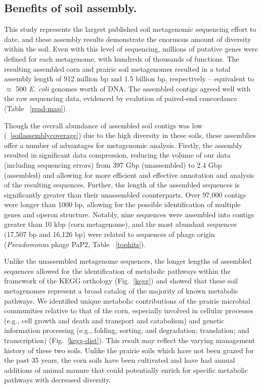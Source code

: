 \documentclass{pnastwo}
\begin{document}
\begin{article}
\subsection*{Benefits of soil assembly.} 
This study represents the largest
published soil metagenomic sequencing effort to date, and these assembly results
demonstrate the enormous amount of diversity within the soil. Even with this
level of sequencing, millions of putative genes were defined for each
metagenome, with hundreds of thousands of functions. The resulting assembled
corn and prairie soil metagenomes resulted in a total assembly length of 912
million bp and 1.5 billion bp, respectively -- equivalent to $\approx$ 500
\emph{E. coli} genomes worth of DNA. The assembled contigs agreed well with the
raw sequencing data, evidenced by evalution of paired-end concordance (Table
~\ref{read-map}).

Though the overall abundance of assembled soil contigs was low (~\ref{soilassemblycoverage}) due to 
the high diversity in these soils, these assemblies offer a number of advantages for metagenomic
analysis. Firstly, the assembly resulted in significant data compression,
reducing the volume of our data (including sequencing errors) from 397 Gbp (unassembled)
to 2.4 Gbp (assembled) and allowing for more efficient and effective annotation
and analysis of the resulting sequences. Further, the length of the assembled sequences
is significantly greater than their unassembled counterparts.  
Over 97,000 contigs were longer than 1000 
bp, allowing for the possible identification of multiple genes and operon structure.
Notably, nine sequences were assembled into contigs greater than 10 kbp (corn
metagenome), and the most abundant sequences (17,507 bp and 16,126 bp) were
related to sequences of phage origin ({\em Pseudomonas} phage PaP2, Table ~\ref{tophits}).

Unlike the unassembled metagenome sequences, the longer lengths of assembled
sequences allowed for the identification of metabolic pathways within the framework of 
the KEGG orthology (Fig.~\ref{kegg}) and showed that these
soil metagenomes represent a broad catalog of the majority of known metabolic pathways. We
identified unique metabolic contributions of the prairie microbial communities
relative to that of the corn, especially involved in cellular processes (e.g.,
cell growth and death and transport and catabolism) and genetic information
processing (e.g., folding, sorting, and degradation; translation; and
transcription) (Fig.~\ref{kegg-dist}). This result may reflect the varying management
history of these two soils. Unlike the prairie soils which have not been grazed
for the past 35 years, the corn soils have been cultivated and have had annual additions of animal manure
that could potentially enrich for specific metabolic pathways with decreased
diversity.


\end{article}
\end{document}

